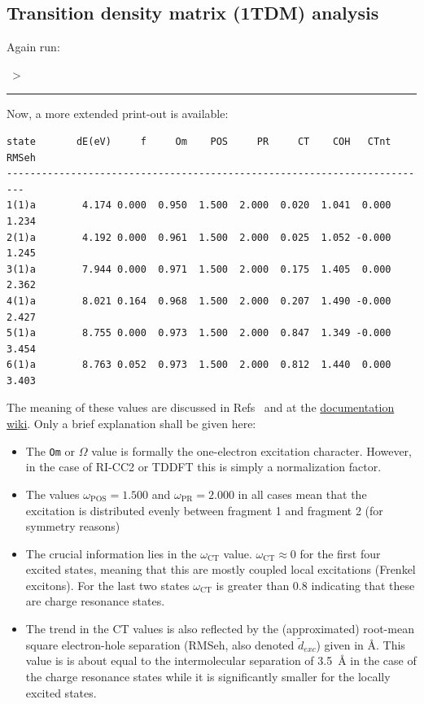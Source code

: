 \documentclass[DIV=12,headings=normal]{scrartcl}
\newcommand\Cline[2][red]{{\sbox\MBox{#2}%
  \rlap{\usebox\MBox}\color{#1}\rule[-1.2\dp\MBox]{\wd\MBox}{0.5pt}}}
\newcommand{\redl}[1]{\Cline{\textcolor{red}{#1}}}
\newcommand{\om}[1]{\omega_{\textrm{#1}}}
\newcommand{\comm}[1]{
\small
~> \redl{#1}
\normalsize
}
\begin{document}
\subsection{Transition density matrix (1TDM) analysis}

Again run:

\comm{analyze\_tden.py}

Now, a more extended print-out is available:

\scriptsize
\begin{Verbatim}[commandchars=\\\{\}]
state       dE(eV)     f     Om    POS     PR     CT    COH   CTnt  RMSeh
-------------------------------------------------------------------------
1(1)a        4.174 0.000  0.950  1.500  2.000  0.020  1.041  0.000  1.234
2(1)a        4.192 0.000  0.961  1.500  2.000  0.025  1.052 -0.000  1.245
3(1)a        7.944 0.000  0.971  1.500  2.000  0.175  1.405  0.000  2.362
4(1)a        8.021 0.164  0.968  1.500  2.000  0.207  1.490 -0.000  2.427
5(1)a        8.755 0.000  0.973  1.500  2.000  0.847  1.349 -0.000  3.454
6(1)a        8.763 0.052  0.973  1.500  2.000  0.812  1.440  0.000  3.403
\end{Verbatim}
\normalsize

The meaning of these values are discussed in Refs~\cite{DMAT, DMAT_ADC_II} and at the \href{https://sourceforge.net/p/theodore-qc/wiki/Transition density matrix analysis/}{documentation wiki}. Only a brief explanation shall be given here:

\begin{itemize}
\item
The \texttt{Om} or $\Omega$ value is formally the one-electron excitation character.
However, in the case of RI-CC2 or TDDFT this is simply a normalization factor.
\item
The values $\om{POS}=1.500$ and $\om{PR}=2.000$ in all cases mean that the excitation is distributed evenly between fragment 1 and fragment 2 (for symmetry reasons)
\item
The crucial information lies in the $\om{CT}$ value. $\om{CT}\approx 0$ for the first four excited states, meaning that this are mostly coupled local excitations (Frenkel excitons). For the last two states $\om{CT}$ is greater than 0.8 indicating that these are charge resonance states.
\item
The trend in the CT values is also reflected by the (approximated) root-mean square electron-hole separation (RMSeh, also denoted $\tilde{d}_{exc}$) given in \AA.\cite{PPV_Steffi}
This value is is about equal to the intermolecular separation of 3.5~\AA{} in the case of the charge resonance states while it is significantly smaller for the locally excited states.
\end{itemize}
\end{document}
